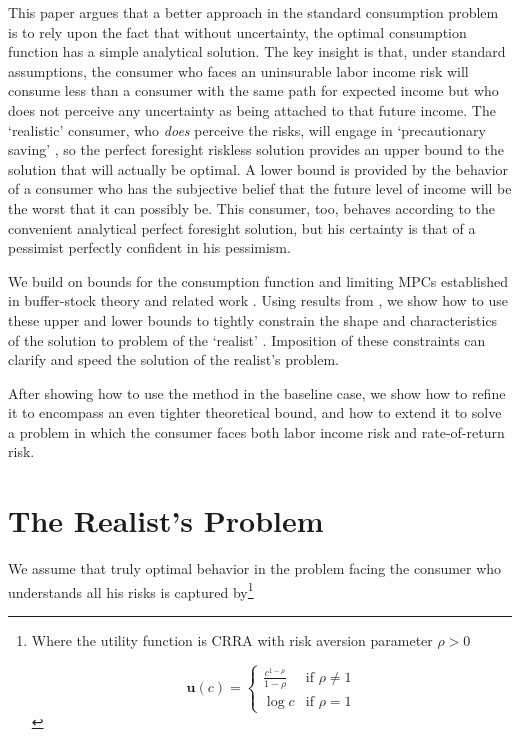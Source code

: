 \documentclass[twocolumn, switch]{article}
\newcommand{\CRRA}{\rho}
\newcommand{\cNrm}{c}
\newcommand{\uFunc}{\mathbf{u}}
\begin{document}
This paper argues that a better approach in the standard consumption problem is
to rely upon the fact that without uncertainty, the optimal consumption function
has a simple analytical solution. The key insight is that, under standard
assumptions, the consumer who faces an uninsurable labor income risk will
consume less than a consumer with the same path for expected income but who does
not perceive any uncertainty as being attached to that future income. The
`realistic' consumer, who \textit{does} perceive the risks, will engage in
`precautionary saving' \citep{Leland1968, Sandmo1970, Kimball1990}, so the perfect foresight riskless solution provides an
upper bound to the solution that will actually be optimal. A lower bound is
provided by the behavior of a consumer who has the subjective belief that the
future level of income will be the worst that it can possibly be. This consumer,
too, behaves according to the convenient analytical perfect foresight solution,
but his certainty is that of a pessimist perfectly confident in his pessimism.

We build on bounds for the consumption function and limiting MPCs established in buffer-stock theory and related work \citep{StachurskiToda2019JET, MST2020JET}. Using results from \citet{CarrollShanker2024}, we show how to use these upper
and lower bounds to tightly constrain the shape and characteristics of the
solution to problem of the `realist' \citep{Carroll1997}. Imposition of these constraints can
clarify and speed the solution of the realist's problem.

After showing how to use the method in the baseline case, we show how to refine
it to encompass an even tighter theoretical bound, and how to extend it
to solve a problem in which the consumer faces both labor income risk and rate-of-return risk.

\section{The Realist's Problem}

We assume that truly optimal behavior in the problem facing the consumer who
understands all his risks is captured by\footnote{Where the utility function is CRRA with risk aversion parameter $\CRRA > 0$

\begin{equation}
\label{eq:UtilityFunc}
\uFunc(\cNrm) = \begin{cases}
\frac{\cNrm^{1-\CRRA}}{1-\CRRA} & \text{if } \CRRA \neq 1 \\
\log \cNrm & \text{if } \CRRA = 1
\end{cases}
\end{equation}}
\end{document}
